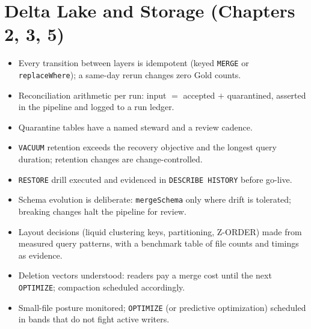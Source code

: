 \section{Delta Lake and Storage (Chapters 2, 3, 5)}
%
\begin{itemize}
    \item[$\square$] Every transition between layers is idempotent (keyed \texttt{MERGE} or
    \texttt{replaceWhere}); a same-day rerun changes zero Gold counts.
    \item[$\square$] Reconciliation arithmetic per run: input $=$ accepted $+$ quarantined,
    asserted in the pipeline and logged to a run ledger.
    \item[$\square$] Quarantine tables have a named steward and a review cadence.
    \item[$\square$] \texttt{VACUUM} retention exceeds the recovery objective and the longest
    query duration; retention changes are change-controlled.
    \item[$\square$] \texttt{RESTORE} drill executed and evidenced in \texttt{DESCRIBE HISTORY}
    before go-live.
    \item[$\square$] Schema evolution is deliberate: \texttt{mergeSchema} only where drift is
    tolerated; breaking changes halt the pipeline for review.
    \item[$\square$] Layout decisions (liquid clustering keys, partitioning, Z-ORDER) made from
    measured query patterns, with a benchmark table of file counts and timings as evidence.
    \item[$\square$] Deletion vectors understood: readers pay a merge cost until the next
    \texttt{OPTIMIZE}; compaction scheduled accordingly.
    \item[$\square$] Small-file posture monitored; \texttt{OPTIMIZE} (or predictive optimization)
    scheduled in bands that do not fight active writers.
\end{itemize}

